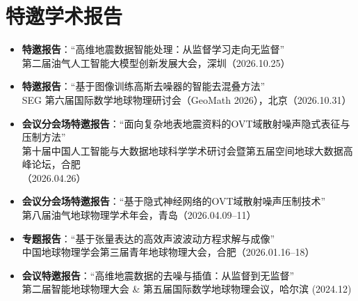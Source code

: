 \documentclass[11pt,a4paper]{article}
\begin{document}
\section{特邀学术报告}
\begin{itemize}
    \item \textbf{特邀报告}：“高维地震数据智能处理：从监督学习走向无监督” \\
    第二届油气人工智能大模型创新发展大会，深圳（2026.10.25）
    \item \textbf{特邀报告}：“基于图像训练高斯去噪器的智能去混叠方法” \\
    SEG 第六届国际数学地球物理研讨会（GeoMath 2026），北京（2026.10.31）
    \item \textbf{会议分会场特邀报告}：“面向复杂地表地震资料的OVT域散射噪声隐式表征与压制方法” \\
    第十届中国人工智能与大数据地球科学学术研讨会暨第五届空间地球大数据高峰论坛，合肥 \\
    （2026.04.26）
    \item \textbf{会议分会场特邀报告}：“基于隐式神经网络的OVT域散射噪声压制技术” \\
    第八届油气地球物理学术年会，青岛（2026.04.09--11）
    \item \textbf{专题报告}：“基于张量表达的高效声波波动方程求解与成像” \\
    中国地球物理学会第三届青年地球物理大会，合肥（2026.01.16--18）
    \item \textbf{会议特邀报告}：“高维地震数据的去噪与插值：从监督到无监督” \\
    第二届智能地球物理大会 \& 第五届国际数学地球物理会议，哈尔滨 (2024.12)
\end{itemize}
\end{document}
